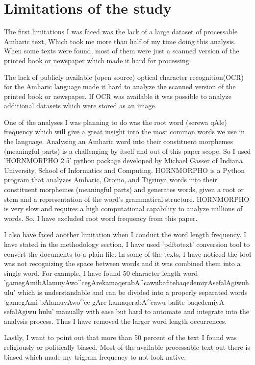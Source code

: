 \section{Limitations of the study}

The first limitations I was faced was the lack of a large dataset of processable Amharic text, Which took me more than half of my time doing this analysis. When some texts were found, most of them were just a scanned version of the printed book or newspaper which made it hard for processing.

The lack of publicly available (open source) optical character recognition(OCR) for the Amharic language made it hard to analyze the scanned version of the printed book or newspaper. If OCR was available it was possible to analyze additional datasets which were stored as an image.

One of the analyses I was planning to do was the root word (\foreignlanguage{ethiop}{serewa qAle}) frequency which will give a great insight into the most common words we use in the language. Analysing an Amharic word into their constituent morphemes (meaningful parts) is a challenging by itself and out of this paper scope. So I used 'HORNMORPHO 2.5'\cite{HornMorpho} python package developed by Michael Gasser of Indiana University, School of Informatics and Computing.  HORNMORPHO is a Python program that analyzes Amharic, Oromo, and Tigrinya words into their constituent morphemes (meaningful parts) and generates words, given a root or stem and a representation of the word’s grammatical structure. HORNMORPHO is very slow and requires a high computational capability to analyze millions of words. So, I have excluded root word frequency from this paper.

I also have faced another limitation when I conduct the word length frequency. I have stated in the methodology section, I have used 'pdftotext' conversion tool to convert the documents to a plain file. In some of the texts, I have noticed the tool was not recognizing the space between words and it was combined them into a single word. For example, I have found 50 character length word '\foreignlanguage{ethiop}{gamegAmibAlamuyAwo^cegArekamaqerabA^cawubafitebaqedemiyAsefalAgiwuhulu}' which is understandable and can be divided into a properly separated words '\foreignlanguage{ethiop}{gamegAmi bAlamuyAwo^ce gAre kamaqerabA^cawu bafite baqedemiyA sefalAgiwu hulu}' manually with ease but hard to automate and integrate into the analysis process. Thus I have removed the larger word length occurrences.

Lastly, I want to point out that more than 50 percent of the text I found was religiously or politically biased. Most of the available processable text out there is biased which made my trigram frequency to not look native. 